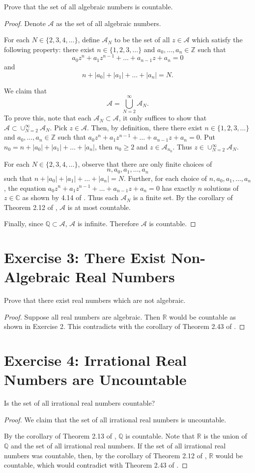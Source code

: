 \documentclass{amsbook}
\theoremstyle{definition}
\theoremstyle{remark}
\numberwithin{section}{chapter}
\numberwithin{equation}{chapter}
\begin{document}
Prove that the set of all algebraic numbers is countable.
\begin{proof}
Denote $\mathcal{A}$ as the set of all algebraic numbers.

For each $N\in\{2,3,4,\dots\}$, define $\mathcal{A}_N$ to be the set of all $z\in\mathcal{A}$ which satisfy the following property: there exist $n\in\{1,2,3,\dots\}$ and $a_0,\dots,a_n\in\mathbb{Z}$ such that \[
a_0z^n+a_1z^{n-1}+\dots+a_{n-1}z+a_n=0
\]and\[
n+|a_0|+|a_1|+\dots+|a_n|=N.
\]

We claim that\[
\mathcal{A}=\bigcup_{N=2}^\infty \mathcal{A}_N.
\] To prove this, note that each $\mathcal{A}_N\subset \mathcal{A}$, it only suffices to show that $\mathcal{A}\subset\cup_{N=2}^\infty \mathcal{A}_N$. Pick $z\in\mathcal{A}$. Then, by definition, there there exist $n\in\{1,2,3,\dots\}$ and $a_0,\dots,a_n\in\mathbb{Z}$ such that $a_0z^n+a_1z^{n-1}+\dots+a_{n-1}z+a_n=0$. Put $n_0=n+|a_0|+|a_1|+\dots+|a_n|$, then $n_0\geqslant 2$ and $z\in\mathcal{A}_{n_0}$. Thus $z\in\cup_{N=2}^\infty \mathcal{A}_N$.

For each $N\in\{2,3,4,\dots\}$, observe that there are only finite choices of\[
n, a_0, a_1,\dots,a_n
\]such that $n+|a_0|+|a_1|+\dots+|a_n|=N$. Further, for each choice of $n, a_0, a_1,\dots,a_n$, the equation $a_0z^n+a_1z^{n-1}+\dots+a_{n-1}z+a_n=0$ has exactly $n$ solutions of $z\in\mathbb{C}$ as shown by 4.14 of \cite{axler2014linear}. Thus each $\mathcal{A}_N$ is a finite set. By the corollary of Theorem 2.12 of \cite{rudin1976principles}, $\mathcal{A}$ is at most countable.

Finally, since $\mathbb{Q}\subset\mathcal{A}$, $\mathcal{A}$ is infinite. Therefore $\mathcal{A}$ is countable.
\end{proof}

\section{Exercise 3: There Exist Non-Algebraic Real Numbers}
Prove that there exist real numbers which are not algebraic.
\begin{proof}
Suppose all real numbers are algebraic. Then $\mathbb{R}$ would be countable as shown in Exercise 2. This contradicts with the corollary of Theorem 2.43 of \cite{rudin1976principles}.
\end{proof}

\section{Exercise 4: Irrational Real Numbers are Uncountable}
Is the set of all irrational real numbers countable?
\begin{proof}
We claim that the set of all irrational real numbers is uncountable.

By the corollary of Theorem 2.13 of \cite{rudin1976principles}, $\mathbb{Q}$ is countable. Note that $\mathbb{R}$ is the union of $\mathbb{Q}$ and the set of all irrational real numbers. If the set of all irrational real numbers was countable, then, by the corollary of Theorem 2.12 of \cite{rudin1976principles}, $\mathbb{R}$ would be countable, which would contradict with Theorem 2.43 of \cite{rudin1976principles}.
\end{proof}
\end{document}
